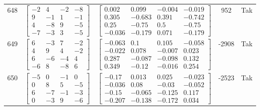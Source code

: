 \documentclass[a4paper,12pt]{article}
\begin{document}
\begin{tabular}{c c c c c}
648
&
$\begin{bmatrix} -2 & 4 & -2 & -8 \\ 9 & -1 & 1 & -1 \\ 4 & -8 & 9 & -5 \\ -7 & -3 & 3 & -5 \end{bmatrix}$
&
$\begin{bmatrix} 0.002 & 0.099 & -0.004 & -0.019 \\ 0.305 & -0.683 & 0.391 & -0.742 \\ 0.25 & -0.75 & 0.5 & -0.75 \\ -0.036 & -0.179 & 0.071 & -0.179 \end{bmatrix}$
&
952
&
Tak
\\
649
&
$\begin{bmatrix} 6 & -3 & 7 & -2 \\ 4 & 9 & 4 & -2 \\ 6 & -6 & -4 & 4 \\ -6 & 8 & -8 & 6 \end{bmatrix}$
&
$\begin{bmatrix} -0.063 & 0.1 & 0.105 & -0.058 \\ -0.022 & 0.078 & -0.007 & 0.023 \\ 0.287 & -0.087 & -0.098 & 0.132 \\ 0.349 & -0.12 & -0.016 & 0.254 \end{bmatrix}$
&
-2908
&
Tak
\\
650
&
$\begin{bmatrix} -5 & 0 & -1 & 0 \\ 0 & 8 & 5 & -5 \\ 6 & -7 & -1 & -3 \\ 0 & -3 & 9 & -6 \end{bmatrix}$
&
$\begin{bmatrix} -0.17 & 0.013 & 0.025 & -0.023 \\ -0.036 & 0.08 & -0.03 & -0.052 \\ -0.15 & -0.065 & -0.125 & 0.117 \\ -0.207 & -0.138 & -0.172 & 0.034 \end{bmatrix}$
&
-2523
&
Tak
\\
\end{tabular} \egroup \newpage
\end{document}
